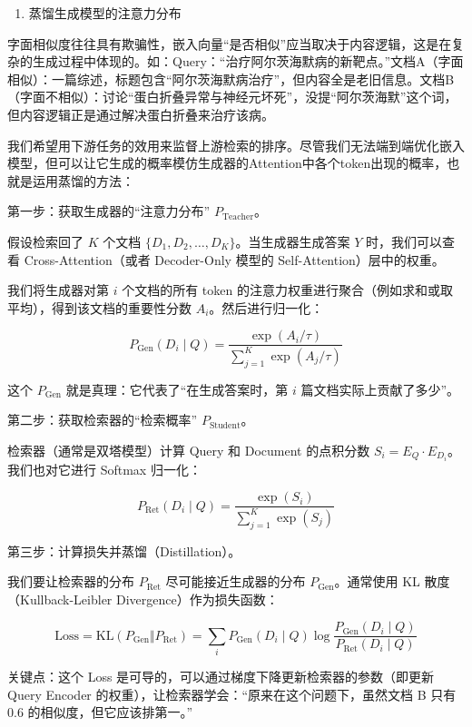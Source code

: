 \begin{enumerate}
\def\labelenumi{\arabic{enumi}.}
\setcounter{enumi}{1}
\tightlist
\item
  蒸馏生成模型的注意力分布
\end{enumerate}

字面相似度往往具有欺骗性，嵌入向量``是否相似''应当取决于内容逻辑，这是在复杂的生成过程中体现的。如：Query：``治疗阿尔茨海默病的新靶点。''文档A（字面相似）：一篇综述，标题包含``阿尔茨海默病治疗''，但内容全是老旧信息。文档B（字面不相似）：讨论``蛋白折叠异常与神经元坏死''，没提``阿尔茨海默''这个词，但内容逻辑正是通过解决蛋白折叠来治疗该病。

我们希望用下游任务的效用来监督上游检索的排序。尽管我们无法端到端优化嵌入模型，但可以让它生成的概率模仿生成器的Attention中各个token出现的概率，也就是运用蒸馏的方法：

第一步：获取生成器的``注意力分布'' \(P_{\mathrm{Teacher}}\)。

假设检索回了 \(K\) 个文档 \(\{D_1,D_2,\ldots,D_K\}\)。当生成器生成答案 \(Y\) 时，我们可以查看 Cross-Attention（或者 Decoder-Only 模型的 Self-Attention）层中的权重。

我们将生成器对第 \(i\) 个文档的所有 token 的注意力权重进行聚合（例如求和或取平均），得到该文档的重要性分数 \(A_i\)。然后进行归一化：

\[
P_{\mathrm{Gen}}(D_i\mid Q)=\frac{\exp(A_i/\tau)}{\sum_{j=1}^{K}\exp(A_j/\tau)}
\]

这个 \(P_{\mathrm{Gen}}\) 就是真理：它代表了``在生成答案时，第 \(i\) 篇文档实际上贡献了多少''。

第二步：获取检索器的``检索概率'' \(P_{\mathrm{Student}}\)。

检索器（通常是双塔模型）计算 Query 和 Document 的点积分数 \(S_i=E_Q\cdot E_{D_i}\)。我们也对它进行 Softmax 归一化：

\[
P_{\mathrm{Ret}}(D_i\mid Q)=\frac{\exp(S_i)}{\sum_{j=1}^{K}\exp(S_j)}
\]

第三步：计算损失并蒸馏（Distillation）。

我们要让检索器的分布 \(P_{\mathrm{Ret}}\) 尽可能接近生成器的分布 \(P_{\mathrm{Gen}}\)。通常使用 KL 散度（Kullback-Leibler Divergence）作为损失函数：

\[
\mathrm{Loss}=\mathrm{KL}(P_{\mathrm{Gen}}\Vert P_{\mathrm{Ret}})=\sum_i P_{\mathrm{Gen}}(D_i\mid Q)\log\frac{P_{\mathrm{Gen}}(D_i\mid Q)}{P_{\mathrm{Ret}}(D_i\mid Q)}
\]

关键点：这个 Loss 是可导的，可以通过梯度下降更新检索器的参数（即更新 Query Encoder 的权重），让检索器学会：``原来在这个问题下，虽然文档 B 只有 \(0.6\) 的相似度，但它应该排第一。''

